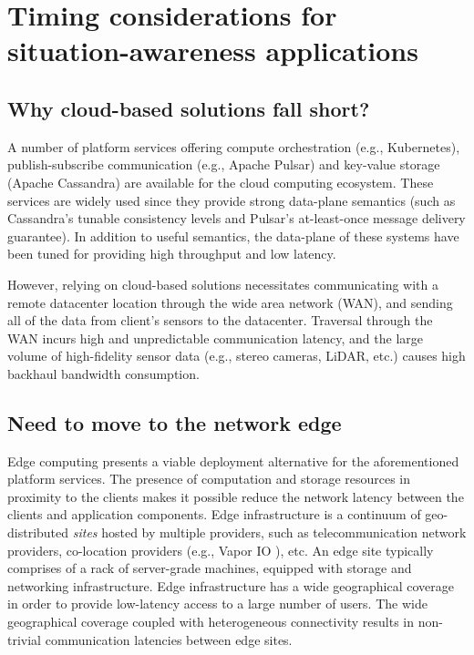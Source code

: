 \section{Timing considerations for situation-awareness applications}
\subsection{Why cloud-based solutions fall short?}
A number of platform services offering compute orchestration (e.g., Kubernetes), publish-subscribe communication (e.g., Apache Pulsar) and key-value storage (Apache Cassandra) are available for the cloud computing ecosystem. These services are widely used since they provide strong data-plane semantics (such as Cassandra's tunable consistency levels and Pulsar's at-least-once message delivery guarantee). In addition to useful semantics, the data-plane of these systems have been tuned for providing high throughput and low latency. 
\par However, relying on cloud-based solutions necessitates communicating with a remote datacenter location through the wide area network (WAN), and sending all of the data from client's sensors to the datacenter. Traversal through the WAN incurs high and unpredictable communication latency, and the large volume of high-fidelity sensor data (e.g., stereo cameras, LiDAR, etc.) causes high backhaul bandwidth consumption. 

\subsection{Need to move to the network edge}
Edge computing \cite{edge} presents a viable deployment alternative for the aforementioned platform services. The presence of computation and storage resources in proximity to the clients makes it possible reduce the network latency between the clients and application components. Edge infrastructure is a continuum of geo-distributed \emph{sites} hosted by multiple providers, such as telecommunication network providers, co-location providers (e.g., Vapor IO \cite{}), etc. An edge site typically comprises of a rack of server-grade machines, equipped with storage and networking infrastructure. Edge infrastructure has a wide geographical coverage in order to provide low-latency access to a large number of users. The wide geographical coverage coupled with heterogeneous connectivity results in non-trivial communication latencies between edge sites.  

